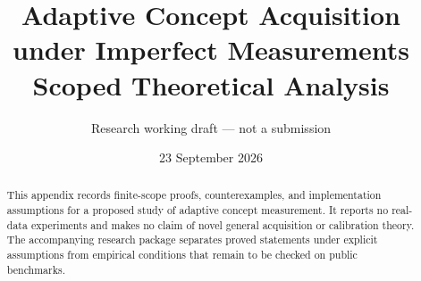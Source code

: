 \documentclass[11pt]{article}
\title{Adaptive Concept Acquisition under Imperfect Measurements\\Scoped Theoretical Analysis}
\author{Research working draft --- not a submission}
\date{23 September 2026}
\begin{document}
\maketitle
\begin{abstract}
This appendix records finite-scope proofs, counterexamples, and implementation
assumptions for a proposed study of adaptive concept measurement. It reports
no real-data experiments and makes no claim of novel general acquisition or
calibration theory. The accompanying research package separates proved
statements under explicit assumptions from empirical conditions that remain
to be checked on public benchmarks.
\end{abstract}

\end{document}
